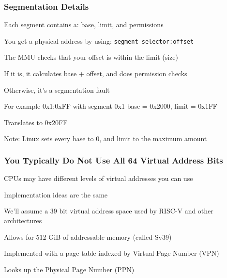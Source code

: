   \begin{frame}
    \frametitle{Segmentation Details}

    Each segment contains a: base, limit, and permissions

    \hspace{2em} You get a physical address by using: \texttt{segment selector:offset}

    \vspace{2em}

    The MMU checks that your offset is within the limit (size)

    \hspace{2em} If it is, it calculates base + offset, and does permission checks

    \hspace{4em} Otherwise, it's a segmentation fault

    \vspace{2em}

    For example 0x1:0xFF with segment 0x1 base = 0x2000, limit = 0x1FF

    \hspace{2em} Translates to 0x20FF

    \vspace{2em}

    Note: Linux sets every base to 0, and limit to the maximum amount
  \end{frame}

  \begin{frame}
    \frametitle{You Typically Do Not Use All 64 Virtual Address Bits}

    CPUs may have different levels of virtual addresses you can use

    \hspace{2em} Implementation ideas are the same

    \vspace{2em}

    We'll assume a 39 bit virtual address space used by RISC-V and other
    architectures

    \hspace{2em} Allows for 512 GiB of addressable memory (called Sv39)

    \vspace{2em}

    Implemented with a page table indexed by Virtual Page Number (VPN)

    \hspace{2em} Looks up the Physical Page Number (PPN)
  \end{frame}

